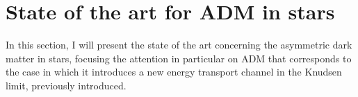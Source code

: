 \section{State of the art for ADM in stars}
In this section, I will present the state of the art concerning the asymmetric dark matter in stars, focusing the attention in particular on ADM that corresponds to the case in which it introduces a new energy transport channel in the Knudsen limit, previously introduced.